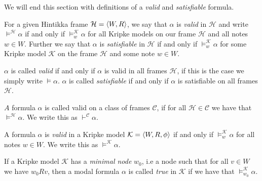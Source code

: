 \documentclass[../main.tex]{subfiles}
\begin{document}
We will end this section with definitions of a \textit{valid} and
\textit{satisfiable} formula.
\begin{defi}
For a given Hintikka frame $\mathcal{H}=\langle W,R\rangle$, we say that $\alpha$ is
\textit{valid} in $\mathcal{H}$ and write $\vDash^\mathcal{H}\alpha$ if and only if
$\vDash^\mathcal{K}_w\alpha$ for all Kripke models on our frame $\mathcal{H}$ and all
notes $w\in W$. Further we say that $\alpha$ is \textit{satisfiable} in $\mathcal{H}$
if and only if $\vDash^\mathcal{K}_w\alpha$ for some Kripke model $\mathcal{K}$ on
the frame $\mathcal{H}$ and some note $w\in W$.

$\alpha$ is called \textit{valid} if and only if $\alpha$ is valid in all frames
$\mathcal{H}$, if this is the case we simply write $\vDash\alpha$. $\alpha$ is
called \textit{satisfiable} if and only if $\alpha$ is satisfiable on all frames
$\mathcal{H}$.

$A$ formula $\alpha$ is called valid on a class of frames $\mathcal{C}$, if for
all $\mathcal{H}\in\mathcal{C}$ we have that $\vDash^\mathcal{H}\alpha$. We
write this as $\vdash^\mathcal{C}\alpha$.

A formula $\alpha$ is \textit{valid} in a Kripke model $\mathcal{K}=\langle
W,R,\phi\rangle$ if and only if $\vDash^\mathcal{K}_w\alpha$ for all notes $w\in
W$. We write this as $\vDash^\mathcal{K}\alpha$.

If a Kripke model $\mathcal{K}$ has a \textit{minimal node} $w_0$, i.e a node
such that for all $v\in W$ we have $w_0Rv$, then a modal formula $\alpha$ is
called  \textit{true} in $\mathcal{K}$ if we have that
$\vDash_{w_0}^\mathcal{K}\alpha$.
\end{defi}
\end{document}

